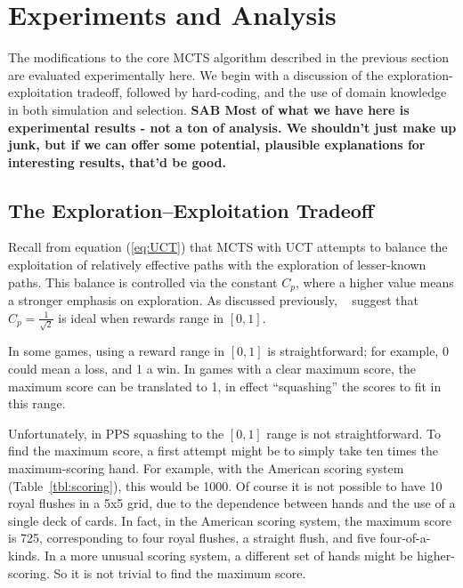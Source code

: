\documentclass[letterpaper]{article}
\begin{document}
\section{Experiments and Analysis}

The modifications to the core MCTS algorithm described in the previous section are evaluated experimentally here. We begin with a discussion of the exploration-exploitation tradeoff, followed by hard-coding, and the use of domain knowledge in both simulation and selection. {\bf SAB Most of what we have here is experimental results - not a ton of analysis. We shouldn't just make up junk, but if we can offer some potential, plausible explanations for interesting results, that'd be good.}

\subsection{The Exploration--Exploitation Tradeoff}
Recall from equation (\ref{eq:UCT}) that MCTS with UCT attempts to balance the exploitation of relatively effective paths with the exploration of lesser-known paths. This balance is controlled via the constant $C_p$, where a higher value means a stronger emphasis on exploration. As discussed previously, ~\cite{kocsis2006improved} suggest that $C_p = \frac{1}{\sqrt{2}}$ is ideal when rewards range in $[0,1]$. 

In some games, using a reward range in $[0,1]$ is straightforward; for example, 0 could mean a loss, and 1 a win. In games with a clear maximum score, the maximum score can be translated to 1, in effect ``squashing'' the scores to fit in this range.

Unfortunately, in PPS squashing to the $[0,1]$ range is not straightforward. To find the maximum score, a first attempt might be to simply take ten times the maximum-scoring hand. For example, with the American scoring system (Table~\ref{tbl:scoring}), this would be 1000. Of course it is not possible to have 10 royal flushes in a 5x5 grid, due to the dependence between hands and the use of a single deck of cards. In fact, in the American scoring system, the maximum score is 725, corresponding to four royal flushes, a straight flush, and five four-of-a-kinds. In a more unusual scoring system, a different set of hands might be higher-scoring. So it is not trivial to find the maximum score.
\end{document}
